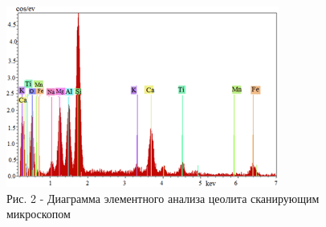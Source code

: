 \begin{figure}[H]
	\centering
	\includegraphics[width=0.8\textwidth]{media/chem/image2}
	\caption*{Рис. 2 - Диаграмма элементного анализа цеолита сканирующим
микроскопом}
\end{figure}

